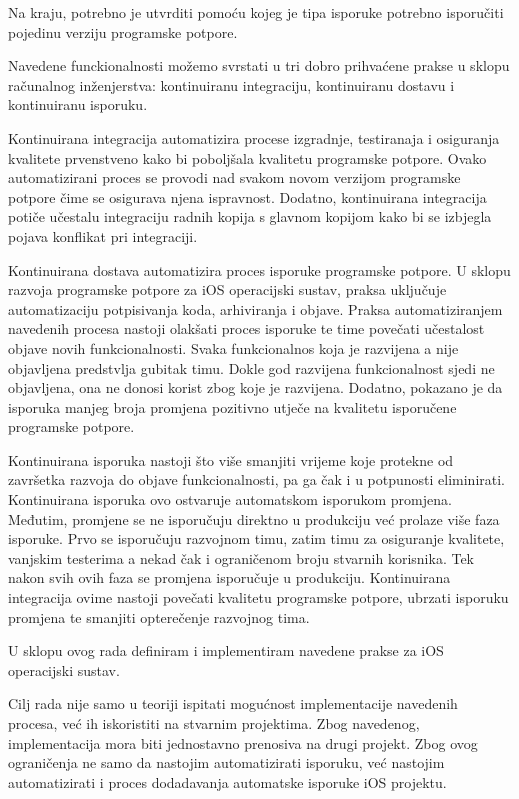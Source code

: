\documentclass[times, utf8, diplomski, numeric]{fer}
\begin{document}
Na kraju, potrebno je utvrditi pomoću kojeg je tipa isporuke potrebno isporučiti pojedinu verziju programske potpore.

Navedene funckionalnosti možemo svrstati u tri dobro prihvaćene prakse u sklopu računalnog inženjerstva: kontinuiranu integraciju, kontinuiranu dostavu i kontinuiranu isporuku.

Kontinuirana integracija automatizira procese izgradnje, testiranaja i osiguranja kvalitete prvenstveno kako bi poboljšala kvalitetu programske potpore. Ovako automatizirani proces se provodi nad svakom novom verzijom programske potpore čime se osigurava njena ispravnost. Dodatno, kontinuirana integracija potiče učestalu integraciju radnih kopija s glavnom kopijom kako bi se izbjegla pojava konflikat pri integraciji.

Kontinuirana dostava automatizira proces isporuke programske potpore. U sklopu razvoja programske potpore za iOS operacijski sustav, praksa uključuje automatizaciju potpisivanja koda, arhiviranja i objave. Praksa automatiziranjem navedenih procesa nastoji olakšati proces isporuke te time povečati učestalost objave novih funkcionalnosti. Svaka funkcionalnos koja je razvijena a nije objavljena predstvlja gubitak timu. Dokle god razvijena funkcionalnost sjedi ne objavljena, ona ne donosi korist zbog koje je razvijena. Dodatno, pokazano je da isporuka manjeg broja promjena pozitivno utječe na kvalitetu isporučene programske potpore.

Kontinuirana isporuka nastoji što više smanjiti vrijeme koje protekne od završetka razvoja do objave funkcionalnosti, pa ga čak i u potpunosti eliminirati. Kontinuirana isporuka ovo ostvaruje automatskom isporukom promjena. Međutim, promjene se ne isporučuju direktno u produkciju već prolaze više faza isporuke. Prvo se isporučuju razvojnom timu, zatim timu za osiguranje kvalitete, vanjskim testerima a nekad čak i ograničenom broju stvarnih korisnika. Tek nakon svih ovih faza se promjena isporučuje u produkciju. Kontinuirana integracija ovime nastoji povečati kvalitetu programske potpore, ubrzati isporuku promjena te smanjiti opterečenje razvojnog tima.

U sklopu ovog rada definiram i implementiram navedene prakse za iOS operacijski sustav.

Cilj rada nije samo u teoriji ispitati mogućnost implementacije navedenih procesa, već ih iskoristiti na stvarnim projektima. Zbog navedenog, implementacija mora biti jednostavno prenosiva na drugi projekt. Zbog ovog ograničenja ne samo da nastojim automatizirati isporuku, već nastojim automatizirati i proces dodadavanja automatske isporuke iOS projektu.
\end{document}
